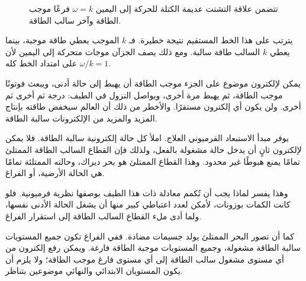\begin{figure}[htbp]
\centering
{}
\caption{تتضمن علاقة التشتت عديمة الكتلة للحركة إلى اليمين \(\omega=k\) فرعًا موجب الطاقة وآخر سالب الطاقة.}
\end{figure}

يترتب على هذا الخط المستقيم نتيجة خطيرة. فـ \(k\) الموجب يعطي طاقة موجبة، بينما يعطي \(k\) السالب طاقة سالبة. ومع ذلك يصف الجزآن موجات متحركة إلى اليمين لأن \(\omega/k=1\) على امتداد الخط كله.

يمكن لإلكترون موضوع على الجزء موجب الطاقة أن يهبط إلى حالة أدنى، ويبعث فوتونًا موجب الطاقة، ثم يهبط مرة أخرى، ويواصل النزول في الطيف: درجة ثم أخرى ثم أخرى. ولن يكون أي إلكترون مستقرًا. والأخطر من ذلك أن العالم سيخفض طاقته بإنتاج المزيد والمزيد من الإلكترونات سالبة الطاقة.

يوفر مبدأ الاستبعاد الفرميوني العلاج. املأ كل حالة إلكترونية سالبة الطاقة. فلا يمكن لإلكترون ثانٍ أن يدخل حالة مشغولة بالفعل، ولذلك فإن القطاع السالب الطاقة الممتلئ تمامًا يمنع هبوطًا غير محدود. وهذا القطاع الممتلئ هو بحر ديراك، وحالته الممتلئة تمامًا هي الحالة الأرضية، أو الفراغ.

\begin{classroomqa}
\end{classroomqa}

وهذا يفسر لماذا يجب أن تُكمم معادلة ذات هذا الطيف بوصفها نظرية فرميونية. فلو كانت الكمات بوزونات، لأمكن لعدد اعتباطي كبير منها أن يشغل الحالة الأدنى نفسها، ولما أدى ملء القطاع السالب الطاقة إلى استقرار الفراغ.

كما أن تصور البحر الممتلئ يولد جسيمات مضادة. ففي الفراغ تكون جميع المستويات سالبة الطاقة مشغولة، وجميع المستويات موجبة الطاقة فارغة. ويمكن رفع إلكترون من أي مستوى مشغول سالب الطاقة إلى أي مستوى فارغ موجب الطاقة؛ ولا يلزم أن يكون المستويان الابتدائي والنهائي موضوعين بتناظر.

